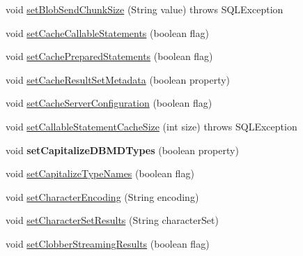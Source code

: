 \begin{DoxyCompactItemize}
void \mbox{\hyperlink{classcom_1_1mysql_1_1jdbc_1_1_connection_properties_impl_a7bf8ddcb8103feee679175048c14a6fc}{set\+Blob\+Send\+Chunk\+Size}} (String value)  throws S\+Q\+L\+Exception 
\item 
void \mbox{\hyperlink{classcom_1_1mysql_1_1jdbc_1_1_connection_properties_impl_a2e984472e42c6ff984d1548c7ba919cb}{set\+Cache\+Callable\+Statements}} (boolean flag)
\item 
void \mbox{\hyperlink{classcom_1_1mysql_1_1jdbc_1_1_connection_properties_impl_a735b9ad315c67ef52c1e968613d2429f}{set\+Cache\+Prepared\+Statements}} (boolean flag)
\item 
void \mbox{\hyperlink{classcom_1_1mysql_1_1jdbc_1_1_connection_properties_impl_ae60b4c7199487d2b0b76cbb340bf9c55}{set\+Cache\+Result\+Set\+Metadata}} (boolean property)
\item 
void \mbox{\hyperlink{classcom_1_1mysql_1_1jdbc_1_1_connection_properties_impl_ad075e2f2ac85a7afcd76647027b10b3f}{set\+Cache\+Server\+Configuration}} (boolean flag)
\item 
void \mbox{\hyperlink{classcom_1_1mysql_1_1jdbc_1_1_connection_properties_impl_afe4c2a741e7dcb6d5e155e91a433af64}{set\+Callable\+Statement\+Cache\+Size}} (int size)  throws S\+Q\+L\+Exception 
\item 
\mbox{\label{classcom_1_1mysql_1_1jdbc_1_1_connection_properties_impl_aacfe09dcdbc5f768f8cad3eee7a405b2}} 
void {\bfseries set\+Capitalize\+D\+B\+M\+D\+Types} (boolean property)
\item 
void \mbox{\hyperlink{classcom_1_1mysql_1_1jdbc_1_1_connection_properties_impl_a4a84837603364f439b6129daaf0dc80d}{set\+Capitalize\+Type\+Names}} (boolean flag)
\item 
void \mbox{\hyperlink{classcom_1_1mysql_1_1jdbc_1_1_connection_properties_impl_a53359a702ef9b70edc1c05f9160c5de6}{set\+Character\+Encoding}} (String encoding)
\item 
void \mbox{\hyperlink{classcom_1_1mysql_1_1jdbc_1_1_connection_properties_impl_a27557cb0d4c7c600b6d381a432d563b8}{set\+Character\+Set\+Results}} (String character\+Set)
\item 
void \mbox{\hyperlink{classcom_1_1mysql_1_1jdbc_1_1_connection_properties_impl_af52719e3b343f8560ed22d772524d835}{set\+Clobber\+Streaming\+Results}} (boolean flag)
\item 
\mbox{\label{classcom_1_1mysql_1_1jdbc_1_1_connection_properties_impl_a96a2162a15668416934cb75d60847034}} 

\end{DoxyCompactItemize}
